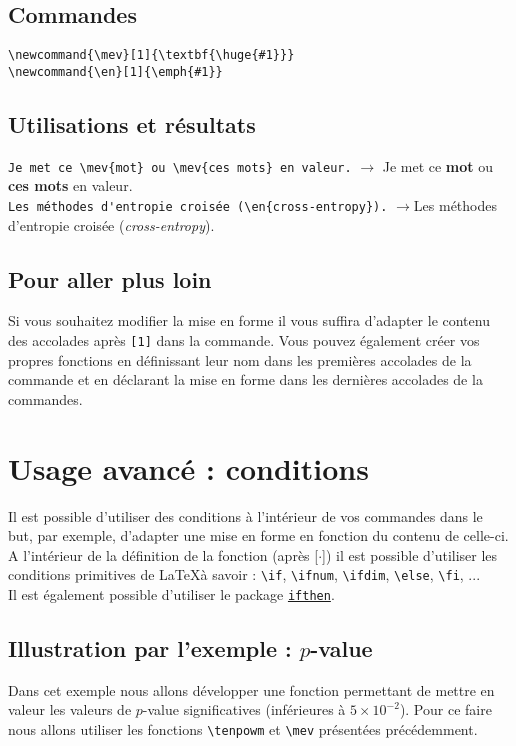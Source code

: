 \documentclass[11pt,a4paper]{article}
\newcommand{\tenpowm}[2]{\ensuremath{{#1\times}10^{-#2}}}
\newcommand{\mev}[1]{\textbf{\huge{#1}}}
\newcommand{\en}[1]{\textit{#1}}
\begin{document}
\subsection*{Commandes}
\verb|\newcommand{\mev}[1]{\textbf{\huge{#1}}}|\\
\verb|\newcommand{\en}[1]{\emph{#1}}|\\
\subsection*{Utilisations et résultats}
\verb|Je met ce \mev{mot} ou \mev{ces mots} en valeur.| $\rightarrow$ Je met ce \mev{mot} ou \mev{ces mots} en valeur.\\

\verb|Les méthodes d'entropie croisée (\en{cross-entropy}).| $\rightarrow$Les méthodes d'entropie croisée (\en{cross-entropy}).
\subsection*{Pour aller plus loin}
Si vous souhaitez modifier la mise en forme il vous suffira d'adapter le contenu des accolades après \verb|[1]| dans la commande. Vous pouvez également créer vos propres fonctions en définissant leur nom dans les premières accolades de la commande et en déclarant la mise en forme dans les dernières accolades de la commandes.

\section{Usage avancé : conditions}
Il est possible d'utiliser des conditions à l'intérieur de vos commandes dans le but,  par exemple,  d'adapter une mise en forme en fonction du contenu de celle-ci.\\

A l'intérieur de la définition de la fonction (après [$\cdot$]) il est possible d'utiliser les conditions primitives de \LaTeX à savoir : \verb|\if|,  \verb|\ifnum|,  \verb|\ifdim|,  \verb|\else|,  \verb|\fi|,  ...\\
Il est également possible d'utiliser le package \href{https://www.ctan.org/pkg/ifthen}{\texttt{ifthen}}.

\subsection*{Illustration par l'exemple : $p$-value}
Dans cet exemple nous allons développer une fonction permettant de mettre en valeur les valeurs de $p$-value significatives (inférieures à \tenpowm{5}{2}). Pour ce faire nous allons utiliser les fonctions \verb|\tenpowm| et \verb|\mev| présentées précédemment.
\end{document}
